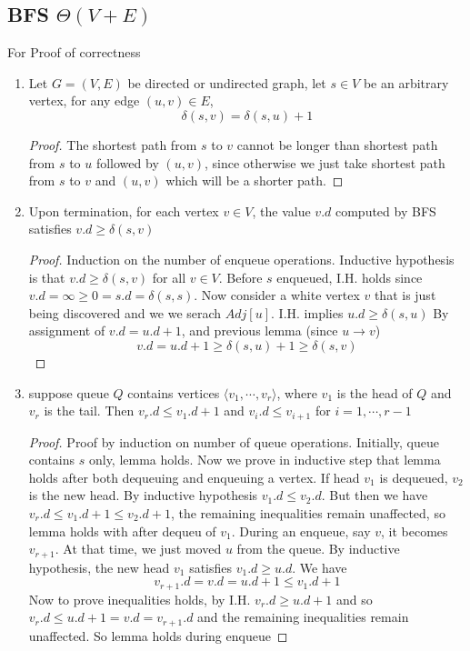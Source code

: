 \documentclass[11pt]{article}
\begin{document}
\subsection*{BFS $\Theta(V+E)$}

\begin{lemma*}
    For Proof of correctness
    \begin{enumerate}
        \item Let $G = (V, E)$ be directed or undirected graph, let $s\in V$ be an arbitrary vertex, for any edge $(u,v) \in E$, 
        \[
            \delta(s, v) = \delta(s, u) + 1
        \]
        \begin{proof}
            The shortest path from $s$ to $v$ cannot be longer than shortest path from $s$ to $u$ followed by $(u,v)$, since otherwise we just take shortest path from $s$ to $v$ and $(u,v)$ which will be a shorter path. 
        \end{proof}
        \item Upon termination, for each vertex $v\in V$, the value $v.d$ computed by BFS satisfies $v.d \geq \delta(s,v)$
        \begin{proof}
            Induction on the number of enqueue operations. Inductive hypothesis is that $v.d \geq \delta(s, v)$ for all $v\in V$. Before $s$ enqueued, I.H. holds since $v.d = \infty \geq 0 = s.d = \delta(s,s)$. Now consider a white vertex $v$ that is just being discovered and we we serach $Adj[u]$. I.H. implies $u.d \geq \delta(s,u)$ By assignment of $v.d = u.d + 1$, and previous lemma (since $u \to v$)
            \[
                v.d = u.d + 1 \geq \delta(s,u) + 1 \geq \delta(s,v)
            \]
        \end{proof}
        \item suppose queue $Q$ contains vertices $\langle v_1, \cdots, v_r \rangle$, where $v_1$ is the head of $Q$ and $v_r$ is the tail. Then $v_r.d \leq v_1.d + 1$ and $v_i.d \leq v_{i+1}$ for $i=1,\cdots, r-1$
        \begin{proof}
            Proof by induction on number of queue operations. Initially, queue contains $s$ only, lemma holds. Now we prove in inductive step that lemma holds after both dequeuing and enqueuing a vertex. If head $v_1$ is dequeued, $v_2$ is the new head. By inductive hypothesis $v_1.d \leq v_2.d$. But then we have $v_r.d \leq v_1.d + 1 \leq v_2.d + 1$, the remaining inequalities remain unaffected, so lemma holds with after dequeu of $v_1$. During an enqueue, say $v$, it becomes $v_{r+1}$. At that time, we just moved $u$ from the queue. By inductive hypothesis, the new head $v_1$ satisfies $v_1.d \geq u.d$. We have 
            \[
                v_{r+1}.d = v.d = u.d + 1 \leq v_1.d + 1
            \]
            Now to prove inequalities holds, by I.H. $v_r.d \geq u.d + 1$ and so $v_r.d \leq u.d + 1 = v.d = v_{r+1}.d$ and the remaining inequalities remain unaffected. So lemma holds during enqueue
        \end{proof}
    \end{enumerate}
\end{lemma*}
\end{document}
